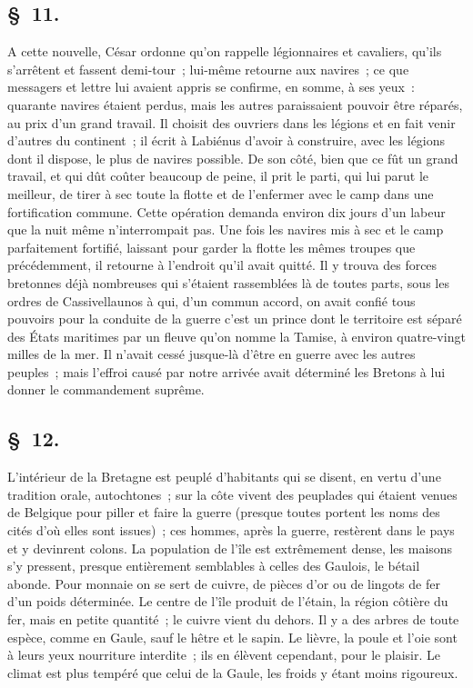 \documentclass[french,twoside]{book} %
\begin{document}
\subsection[{§ 11.}]{ \textsc{§ 11.} }
\noindent A cette nouvelle, César ordonne qu’on rappelle légionnaires et cavaliers, qu’ils s’arrêtent et fassent demi-tour ; lui-même retourne aux navires ; ce que messagers et lettre lui avaient appris se confirme, en somme, à ses yeux : quarante navires étaient perdus, mais les autres paraissaient pouvoir être réparés, au prix d’un grand travail. Il choisit des ouvriers dans les légions et en fait venir d’autres du continent ; il écrit à Labiénus d’avoir à construire, avec les légions dont il dispose, le plus de navires possible. De son côté, bien que ce fût un grand travail, et qui dût coûter beaucoup de peine, il prit le parti, qui lui parut le meilleur, de tirer à sec toute la flotte et de l’enfermer avec le camp dans une fortification commune. Cette opération demanda environ dix jours d’un labeur que la nuit même n’interrompait pas. Une fois les navires mis à sec et le camp parfaitement fortifié, laissant pour garder la flotte les mêmes troupes que précédemment, il retourne à l’endroit qu’il avait quitté. Il y trouva des forces bretonnes déjà nombreuses qui s’étaient rassemblées là de toutes parts, sous les ordres de Cassivellaunos à qui, d’un commun accord, on avait confié tous pouvoirs pour la conduite de la guerre c’est un prince dont le territoire est séparé des États maritimes par un fleuve qu’on nomme la Tamise, à environ quatre-vingt milles de la mer. Il n’avait cessé jusque-là d’être en guerre avec les autres peuples ; mais l’effroi causé par notre arrivée avait déterminé les Bretons à lui donner le commandement suprême.
\subsection[{§ 12.}]{ \textsc{§ 12.} }
\noindent L'intérieur de la Bretagne est peuplé d’habitants qui se disent, en vertu d’une tradition orale, autochtones ; sur la côte vivent des peuplades qui étaient venues de Belgique pour piller et faire la guerre (presque toutes portent les noms des cités d’où elles sont issues) ; ces hommes, après la guerre, restèrent dans le pays et y devinrent colons. La population de l’île est extrêmement dense, les maisons s’y pressent, presque entièrement semblables à celles des Gaulois, le bétail abonde. Pour monnaie on se sert de cuivre, de pièces d’or ou de lingots de fer d’un poids déterminée. Le centre de l’île produit de l’étain, la région côtière du fer, mais en petite quantité ; le cuivre vient du dehors. Il y a des arbres de toute espèce, comme en Gaule, sauf le hêtre et le sapin. Le lièvre, la poule et l’oie sont à leurs yeux nourriture interdite ; ils en élèvent cependant, pour le plaisir. Le climat est plus tempéré que celui de la Gaule, les froids y étant moins rigoureux.
\end{document}
